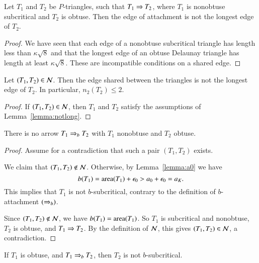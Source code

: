 \begin{lemma}\label{lemma:notlong}  
Let $T_1$ and $T_2$ be $P$-triangles, such that $T_1\Rightarrow T_2$, where $T_1$ is nonobtuse subcritical and
  $T_2$ is obtuse.  Then the edge of attachment is not the longest
  edge of $T_2$.
\end{lemma}

\begin{proof} We have seen that each edge of a nonobtuse subcritical
  triangle has length less than $\kappa\sqrt8$ and that the longest edge of an
  obtuse Delaunay triangle has length at least $\kappa\sqrt{8}$.  These are
  incompatible conditions on a shared edge.
\end{proof}

\begin{lemma}  
  Let $(T_1,T_2)\in\mathcal N$.  Then the edge shared between the triangles is
  not the longest edge of $T_2$.  In particular, $n_2(T_2)\le 2$.
\end{lemma}

\begin{proof} If $(T_1,T_2)\in \mathcal N$, then $T_1$ and $T_2$ satisfy the
  assumptions of Lemma~\ref{lemma:notlong}.
\end{proof}

\begin{lemma}\label{lemma:no-ao} 
  There is no arrow $T_1 \Rightarrow_{b} T_2$ with $T_1$ nonobtuse and $T_2$
  obtuse.
\end{lemma}

\begin{proof}  
  Assume for a contradiction that such a pair $(T_1,T_2)$ exists.

  We claim that $(T_1,T_2)\not\in \mathcal N$.  Otherwise, by
  Lemma~\ref{lemma:a0} we have
\[
b(T_1) = {\operatorname{area}}(T_1) + \epsilon_0 > a_0 + \epsilon_0 =  a_K.
\]
This implies that $T_1$ is not $b$-subcritical, contrary to the
definition of $b$-attachment $(\Rightarrow_{b})$.

Since $(T_1,T_2)\not\in \mathcal N$, we have $b(T_1) = {\operatorname{area}}(T_1)$.  So $T_1$
is subcritical and nonobtuse, $T_2$ is obtuse, and $T_1\Rightarrow
T_2$.  By the definition of $\mathcal N$, this gives $(T_1,T_2)\in\mathcal N$, a
contradiction.
\end{proof}


\begin{lemma}\label{lemma:t2b}
  If $T_1$ is obtuse, and $T_1 \Rightarrow_{b} T_2$, then $T_2$ is not
  $b$-subcritical.
\end{lemma}

